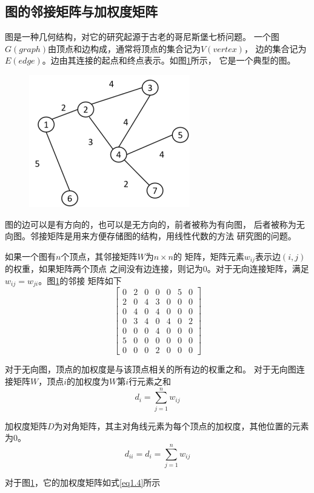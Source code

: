 \documentclass[lang=cn,10pt]{elegantbook}
\begin{document}
\subsection*{图的邻接矩阵与加权度矩阵}
\par 图是一种几何结构，对它的研究起源于古老的哥尼斯堡七桥问题。
一个图$G(graph)$由顶点和边构成，通常将顶点的集合记为$V(vertex)$，
边的集合记为$E(edge)$。边由其连接的起点和终点表示。如图\ref{g}所示，
它是一个典型的图。
\begin{figure}[h]
	\centering
	\includegraphics[scale = 0.8]{img/g.png}
	\caption{}
	\label{g}
\end{figure}
\par 图的边可以是有方向的，也可以是无方向的，前者被称为有向图，
后者被称为无向图。邻接矩阵是用来方便存储图的结构，用线性代数的方法
研究图的问题。
\par 如果一个图有$n$个顶点，其邻接矩阵$W$为$n \times n$的
矩阵，矩阵元素$w_{ij}$表示边$(i,j)$的权重，如果矩阵两个顶点
之间没有边连接，则记为$0$。对于无向连接矩阵，满足$w_{ij} = w_{ji}$。图\ref{g}的邻接
矩阵如下
\begin{equation*}
	\begin{bmatrix}
		0 & 2 & 0 & 0 & 0 & 5 & 0 \\
		2 & 0 & 4 & 3 & 0 & 0 & 0 \\
		0 & 4 & 0 & 4 & 0 & 0 & 0 \\
		0 & 3 & 4 & 0 & 4 & 0 & 2 \\
		0 & 0 & 0 & 4 & 0 & 0 & 0 \\
		5 & 0 & 0 & 0 & 0 & 0 & 0 \\
		0 & 0 & 0 & 2 & 0 & 0 & 0
	\end{bmatrix}
\end{equation*}
\par 对于无向图，顶点的加权度是与该顶点相关的所有边的权重之和。
对于无向图连接矩阵$W$，顶点$i$的加权度为$W$第$i$行元素之和
\begin{equation*}
	d_i = \sum_{j=1}^nw_{ij}
\end{equation*}
\par 加权度矩阵$D$为对角矩阵，其主对角线元素为每个顶点的加权度，其他位置的元素为$0$。
\begin{equation}
	d_{ii} = d_i = \sum_{j=1}^nw_{ij}
\end{equation}
\par 对于图\ref{g}，它的加权度矩阵如式\ref{eq1.4}所示
\end{document}
